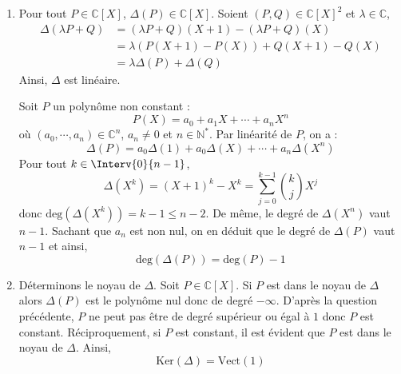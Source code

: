 \documentclass[a4paper,10pt]{report}
\begin{document}
\begin{enumerate}
\item Pour tout $P \in \mathbb{C}[X]$, $\Delta(P) \in \mathbb{C}[X]$. Soient $(P,Q) \in \mathbb{C}[X]^2$ et $\lambda \in \mathbb{C}$,
\begin{align*}
\Delta(\lambda P +Q) & = (\lambda P+Q)(X+1) - (\lambda P +Q)(X) \\
& = \lambda (P(X+1)-P(X)) + Q(X+1)-Q(X) \\
& = \lambda \Delta(P) + \Delta(Q)
\end{align*}
Ainsi, $\Delta$ est linéaire.

\medskip

\noindent Soit $P$ un polynôme non constant :
$$ P(X) = a_0 + a_1 X + \cdots + a_n X^n$$
où $(a_0, \cdots, a_n) \in \mathbb{C}^n$, $a_n \neq 0$ et $n \in \mathbb{N}^*$. Par linéarité de $P$, on a :
$$ \Delta(P) = a_0 \Delta(1)+ a_0 \Delta(X) + \cdots + a_n \Delta(X^n)$$
Pour tout $k \in \Interv{0}{n-1}$,
$$ \Delta(X^k) = (X+1)^k - X^k = \sum_{j=0}^{k-1} \binom{k}{j} X^j$$
donc $\textrm{deg}(\Delta(X^k))=k-1 \leq n-2$. De même, le degré de $\Delta(X^n)$ vaut $n-1$. Sachant que $a_n$ est non nul, on en déduit que le degré de $\Delta(P)$ vaut $n-1$ et ainsi,
$$ \textrm{deg}(\Delta(P)) = \textrm{deg}(P)-1$$
\item Déterminons le noyau de $\Delta$. Soit $P \in \mathbb{C}[X]$. Si $P$ est dans le noyau de $\Delta$ alors $\Delta(P)$ est le polynôme nul donc de degré $- \infty$. D'après la question précédente, $P$ ne peut pas être de degré supérieur ou égal à $1$ donc $P$ est constant. Réciproquement, si $P$ est constant, il est évident que $P$ est dans le noyau de $\Delta$. Ainsi,
$$ \textrm{Ker}(\Delta) = \textrm{Vect}(1)$$


\end{enumerate}
\end{document}

